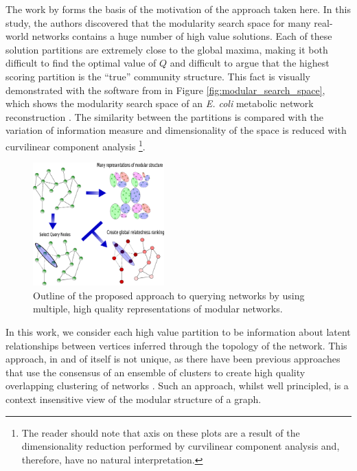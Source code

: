 \documentclass[sigconf]{acmart}
\begin{document}
The work by \cite{good2010performance} forms the basis of the motivation of the approach taken here.
In this study, the authors discovered that the modularity search space for many real-world networks contains a huge number of high value solutions.
Each of these solution partitions are extremely close to the global maxima, making it both difficult to find the optimal value of $Q$ and difficult to argue that the highest scoring partition is the ``true'' community structure.
This fact is visually demonstrated with the software from \cite{good2010performance} in Figure \ref{fig:modular_search_space}, which shows the modularity search space of an \textit{E. coli} metabolic network reconstruction \cite{GuimeraNature2005}.
The similarity between the partitions is compared with the variation of information measure \cite{meilua2003comparing} and dimensionality of the space is reduced with curvilinear component analysis \cite{demartines1997curvilinear} \footnote{The reader should note that axis on these plots are a result of the dimensionality reduction performed by curvilinear component analysis \cite{demartines1997curvilinear} and, therefore, have no natural interpretation.}.

\begin{figure}[t]
    \centering
    \includegraphics[width=0.45\textwidth]{images/meth_fig/fig1_desc.eps}
    \caption{Outline of the proposed approach to querying networks by using multiple, high quality representations of modular networks.}
    \label{fig:algorithm_outline}
\end{figure}

In this work, we consider each high value partition to be information about latent relationships between vertices inferred through the topology of the network.
This approach, in and of itself is not unique, as there have been previous approaches that use the consensus of an ensemble of clusters to create high quality overlapping clustering of networks \cite{lancichinetti2012consensus}.
Such an approach, whilst well principled, is a context insensitive view of the modular structure of a graph.
\end{document}
